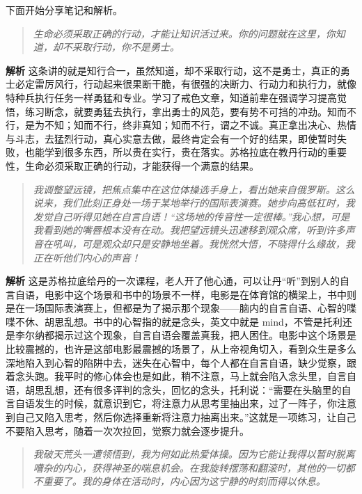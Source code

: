 下面开始分享笔记和解析。

\begin{quote}\it
    生命必须采取正确的行动，才能让知识活过来。你的问题就在这里，你知道，却不采取行动，你不是勇士。
\end{quote}

\textbf{解析} 这条讲的就是知行合一，虽然知道，却不采取行动，这不是勇士，真正的勇士必定雷厉风行，行动起来很果断干脆，有很强的决断力、行动力和执行力，就像特种兵执行任务一样勇猛和专业。学习了戒色文章，知道前辈在强调学习提高觉悟，练习断念，就要勇猛去执行，拿出勇士的风范，要有势不可挡的冲劲。知而不行，是为不知；知而不行，终非真知；知而不行，谓之不诚。真正拿出决心、热情与斗志，去猛烈行动，真心实意去做，最终肯定会有一个好的结果，即使暂时失败，也能学到很多东西，所以贵在实行，贵在落实。苏格拉底在教丹行动的重要性，生命必须采取正确的行动，才能获得一个满意的结果。

\begin{quote}\it
    我调整望远镜，把焦点集中在这位体操选手身上，看出她来自俄罗斯。这么说来，我们此刻正身处一场于某地举行的国际表演赛。她步向高低杠时，我发觉自己听得见她在自言自语！“这场地的传音性一定很棒。”我心想，可是我看到她的嘴唇根本没有在动。我把望远镜头迅速移到观众席，听到许多声音在吼叫，可是观众却只是安静地坐着。我恍然大悟，不晓得什么缘故，我正在听他们内心的声音！
\end{quote}

\textbf{解析} 这是苏格拉底给丹的一次课程，老人开了他心通，可以让丹“听”到别人的自言自语，电影中这个场景和书中的场景不一样，电影是在体育馆的横梁上，书中则是在一场国际表演赛上，但都是为了揭示那个现象——脑内的自言自语、心智的喋喋不休、胡思乱想。书中的心智指的就是念头，英文中就是 mind，不管是托利还是李尔纳都揭示过这个现象，自言自语会覆盖真我，把人困住。电影中这个场景是比较震撼的，也许是这部电影最震撼的场景了，从上帝视角切入，看到众生是多么深地陷入到心智的陷阱中去，迷失在心智中，每个人都在自言自语，缺少觉察，跟着念头跑。我平时的修心体会也是如此，稍不注意，马上就会陷入念头里，自言自语，胡思乱想，还有很多评判的念头，回忆的念头，托利说：“需要在头脑里的自言自语发生的时候，就意识到它，将注意力从思考里抽出来，过了一阵子，你注意到自己又陷入思考，然后你选择重新将注意力抽离出来。”这就是一项练习，让自己不要陷入思考，随着一次次拉回，觉察力就会逐步提升。

\begin{quote}\it
    我破天荒头一遭领悟到，我为何如此热爱体操。因为它能让我得以暂时脱离嘈杂的内心，获得神圣的喘息机会。在我旋转摆荡和翻滚时，其他的一切都不重要了。我的身体在活动时，内心因为这宁静的时刻而得以休息。
\end{quote}

